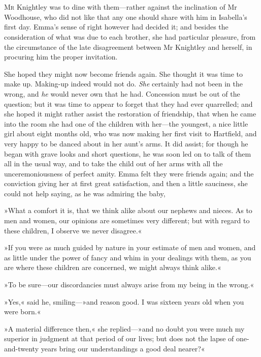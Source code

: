\chapter[Chapter \thechapter]{}
\lettrine[lines=4,lraise=0.3]{M}{r} Knightley was to dine with them—rather against the inclination of Mr Woodhouse, who did not like that any one should share with him in Isabella's first day. Emma's sense of right however had decided it; and besides the consideration of what was due to each brother, she had particular pleasure, from the circumstance of the late disagreement between Mr Knightley and herself, in procuring him the proper invitation.

She hoped they might now become friends again. She thought it was time to make up. Making-up indeed would not do. \textit{She} certainly had not been in the wrong, and \textit{he} would never own that he had. Concession must be out of the question; but it was time to appear to forget that they had ever quarrelled; and she hoped it might rather assist the restoration of friendship, that when he came into the room she had one of the children with her—the youngest, a nice little girl about eight months old, who was now making her first visit to Hartfield, and very happy to be danced about in her aunt's arms. It did assist; for though he began with grave looks and short questions, he was soon led on to talk of them all in the usual way, and to take the child out of her arms with all the unceremoniousness of perfect amity. Emma felt they were friends again; and the conviction giving her at first great satisfaction, and then a little sauciness, she could not help saying, as he was admiring the baby,

»What a comfort it is, that we think alike about our nephews and nieces. As to men and women, our opinions are sometimes very different; but with regard to these children, I observe we never disagree.«

»If you were as much guided by nature in your estimate of men and women, and as little under the power of fancy and whim in your dealings with them, as you are where these children are concerned, we might always think alike.«

»To be sure—our discordancies must always arise from my being in the wrong.«

»Yes,« said he, smiling—»and reason good. I was sixteen years old when you were born.«

»A material difference then,« she replied—»and no doubt you were much my superior in judgment at that period of our lives; but does not the lapse of one-and-twenty years bring our understandings a good deal nearer?«

